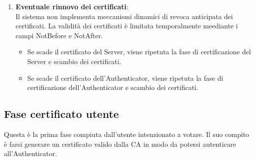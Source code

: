 \begin{enumerate}
	\item \textbf{Eventuale rinnovo dei certificati}: \\
	Il sistema non implementa meccanismi dinamici di revoca anticipata dei certificati. La validità dei certificati è limitata temporalmente meediante i campi NotBefore e NotAfter.
		\begin{itemize}
			\item Se scade il certificato del Server, viene ripetuta la fase di certificazione del Server e scambio dei certificati.
			\item Se scade il certificato dell'Authenticator, viene ripetuta la fase di certificazione dell'Authenticator e scambio dei certificati.
		\end{itemize}
\end{enumerate}


\subsection{Fase certificato utente}
Questa è la prima fase compiuta dall'utente intenzionato a votare. Il suo compito è farsi generare un certificato valido dalla CA in modo da potersi autenticare all'Authenticator.

\begin{figure}[H]
	\centering
	\scalebox{0.7}{}
\end{figure}

